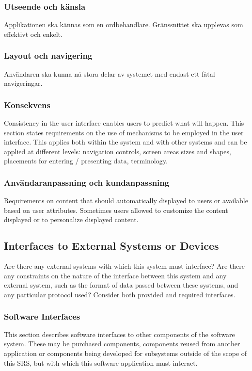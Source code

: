 \subsubsection{Utseende och känsla}
Applikationen ska kännas som en ordbehandlare. Gränssnittet ska upplevas som effektivt och enkelt.

\subsubsection{Layout och navigering}
Användaren ska kunna nå stora delar av systemet med endast ett fåtal navigeringar. 

\subsubsection{Konsekvens}
Consistency in the user interface enables users to predict what will happen. This section states requirements on the use of mechanisms to be employed in the user interface. This applies both within the system and with other systems and can be applied at different levels: navigation controls, screen areas sizes and shapes, placements for entering / presenting data, terminology.

\subsubsection{Användaranpassning och kundanpassning}
Requirements on content that should automatically displayed to users or available based on user attributes. Sometimes users allowed to customize the content displayed or to personalize displayed content.

\subsection{Interfaces to External Systems or Devices}
Are there any external systems with which this system must interface? Are there any constraints on the nature of the interface between this system and any external system, such as the format of data passed between these systems, and any particular protocol used? Consider both provided and required interfaces.

\subsubsection{Software Interfaces}
This section describes software interfaces to other components of the software system. These may be purchased components, components reused from another application or components being developed for subsystems outside of the scope of this SRS, but with which this software application must interact.

